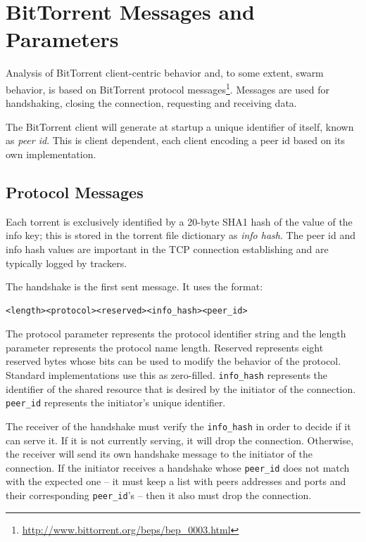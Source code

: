 \section{BitTorrent Messages and Parameters}
\label{sec:proto-measure:protocol-messages}

Analysis of BitTorrent client-centric behavior and, to some extent, swarm
behavior, is based on BitTorrent protocol
messages\footnote{\url{http://www.bittorrent.org/beps/bep\_0003.html}}. Messages are
used for handshaking, closing the connection, requesting and receiving data.

The BitTorrent client will generate at startup a unique identifier of itself,
known as \textit{peer id}. This is client dependent, each client encoding a
peer id based on its own implementation.

\subsection{Protocol Messages}

Each torrent is exclusively identified by a 20-byte SHA1 hash of the value of
the info key; this is stored in the torrent file dictionary as \textit{info
hash}. The peer id and info hash values are important in the TCP connection
establishing and are typically logged by trackers.

The handshake is the first sent message. It uses the format:
\begin{verbatim}
<length><protocol><reserved><info_hash><peer_id>
\end{verbatim}

The protocol parameter represents the protocol identifier string and the
length parameter represents the protocol name length. Reserved represents
eight reserved bytes whose bits can be used to modify the behavior of the
protocol. Standard implementations use this as zero-filled.
\texttt{info\_hash} represents the identifier of the shared resource that is
desired by the initiator of the connection. \texttt{peer\_id} represents the
initiator's unique identifier.

The receiver of the handshake must verify the \texttt{info\_hash} in order to
decide if it can serve it. If it is not currently serving, it will drop the
connection.  Otherwise, the receiver will send its own handshake message to
the initiator of the connection. If the initiator receives a handshake whose
\texttt{peer\_id} does not match with the expected one -- it must keep a list
with peers addresses and ports and their corresponding \texttt{peer\_id}'s --
then it also must drop the connection.

